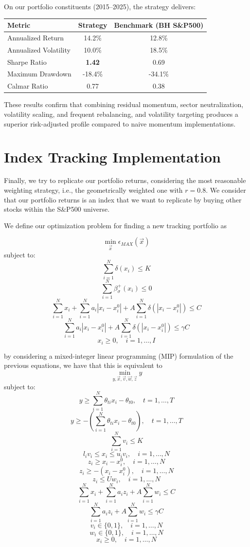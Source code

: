 \documentclass[12pt, a4paper]{article}
\begin{document}
	On our portfolio constituents (2015--2025), the strategy delivers:
	
	\begin{center}
		\begin{tabular}{lcc}
			\toprule
			Metric & Strategy & Benchmark (BH S\&P500) \\
			\midrule
			Annualized Return   & 14.2\% & 12.8\% \\
			Annualized Volatility & 10.0\% & 18.5\% \\
			Sharpe Ratio        & \textbf{1.42} & 0.69 \\
			Maximum Drawdown    & -18.4\% & -34.1\% \\
			Calmar Ratio        & 0.77 & 0.38 \\
			\bottomrule
		\end{tabular}
	\end{center}
	
	These results confirm that combining residual momentum, sector neutralization, volatility scaling, and frequent rebalancing, and volatility targeting produces a superior risk-adjusted profile compared to naive momentum implementations.		
		
	
	\section{Index Tracking Implementation}
	Finally, we try to replicate our portfolio returns, considering the most reasonable weighting strategy, i.e., the geometrically weighted one with $r=0.8$. We consider that our portfolio returns is an index that we want to replicate by buying other stocks within the S\&P500 universe. 
	
	We define our optimization problem for finding a new tracking portfolio as
	
	$$
	\min_{\vec{x}} \epsilon_{MAX}(\vec{x})
	$$
	subject to:
	$$
	\sum_{i=1}^N \delta(x_i) \leq K
	$$
	$$
	\sum_{i=1}^N \beta_{\sigma}^{+}(x_i) \leq 0
	$$
	$$
	\sum_{i=1}^N x_i + \sum_{i=1}^N a_i |x_i - x_i^0| + A\sum_{i=1}^N \delta(|x_i - x_i^0|) \leq C
	$$
	$$
	\sum_{i=1}^N a_i |x_i - x_i^0| + A\sum_{i=1}^N \delta(|x_i - x_i^0|) \leq \gamma C
	$$
	$$
	x_i \geq 0, \quad i=1, \ldots, I
	$$
	
	by considering a mixed-integer linear programming (MIP) formulation of the previous equations, we have that this is equivalent to 
	$$
	\min_{y,\vec{x},\vec{v},\vec{w},\vec{z}} y
	$$
	subject to:
	$$
	y \geq \sum_{i=1}^N \theta_{ti}x_i - \theta_{t0}, \quad t=1,\ldots,T
	$$
	$$
	y \geq -\left(\sum_{i=1}^N \theta_{ti}x_i - \theta_{t0}\right), \quad t=1,\ldots,T
	$$
	$$
	\sum_{i=1}^N v_i \leq K
	$$
	$$
	l_i v_i \leq x_i \leq u_i v_i, \quad i=1,\ldots,N
	$$
	$$
	z_i \geq x_i - x_i^0, \quad i=1,\ldots,N
	$$
	$$
	z_i \geq -(x_i - x_i^0), \quad i=1,\ldots,N
	$$
	$$
	z_i \leq Uw_i, \quad i=1,\ldots,N
	$$
	$$
	\sum_{i=1}^N x_i + \sum_{i=1}^N a_i z_i + A\sum_{i=1}^N w_i \leq C
	$$
	$$
	\sum_{i=1}^N a_i z_i + A\sum_{i=1}^N w_i \leq \gamma C
	$$
	$$
	v_i \in \{0,1\}, \quad i=1,\ldots,N
	$$
	$$
	w_i \in \{0,1\}, \quad i=1,\ldots,N
	$$
	$$
	x_i \geq 0, \quad i=1,\ldots,N
	$$
	
\end{document}

